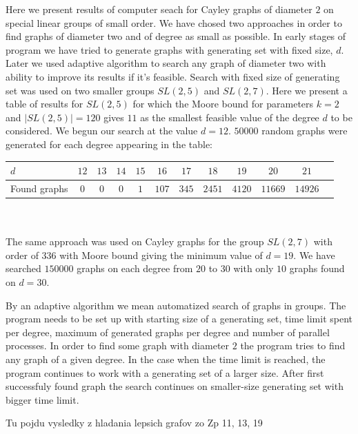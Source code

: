 \documentclass[a4paper,12pt,oneside]{report}%
\begin{document}
Here we present results of computer seach for Cayley graphs of diameter $2$ on special linear groups of small order. We have chosed two approaches in order to find graphs of diameter two and of degree as small as possible. In early stages of program we have tried to generate graphs with generating set with fixed size, $d$. 
Later we used adaptive algorithm to search any graph of diameter two with ability to improve its results if it's feasible. Search with fixed size of generating set was used on two smaller groups $SL(2,5)$ and $SL(2,7)$. Here we present a table of results for $SL(2,5)$ for which the Moore bound for  parameters $k=2$ and $|SL(2,5)| = 120$ gives $11$ as the smallest feasible value of the degree $d$ to be considered. We begun our search at the value $d=12$. $50000$ random graphs were generated for each degree appearing in the table: \\

\begin{tabular}[htbp]{l*{10}{c}r}
	$d$	& $12$ & $13$ & $14$ & $15$ & $16$ & $17$ & $18$ & $19$ & $20$ & $21$ \\
\hline
	Found graphs & $0$ & $0$  & $0$ & $1$ & $107$ & $345$ & $2451$  & $4120$ & $11669$ & $14926$ \\
\end{tabular} \\ \\

The same approach was used on Cayley graphs for the group $SL(2,7)$ with order of $336$ with Moore bound giving the minimum value of $d=19$. We have searched $150000$ graphs on each degree from $20$ to $30$ with only $10$ graphs found on $d=30$.

By an adaptive algorithm we mean automatized search of graphs in groups. The program needs to be set up with starting size of a generating set, time limit spent per degree, maximum of generated graphs per degree and number of parallel processes. In order to find some graph with diameter $2$ the program tries to find any graph of a given  degree. In the case when the time limit is reached, the program continues to work with a generating set of a larger size. After first successfuly found graph the search continues on smaller-size generating set with bigger time limit.

Tu pojdu vysledky z hladania lepsich grafov zo Zp 11, 13, 19
\end{document}

